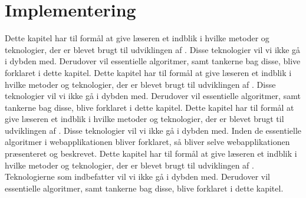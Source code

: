 \chapter{Implementering}
\label{chap:implementering}
Dette kapitel har til formål at give læseren et indblik i hvilke metoder og teknologier, der er blevet brugt til udviklingen af \Foodl. Disse teknologier vil vi ikke gå i dybden med. Derudover vil essentielle algoritmer, samt tankerne bag disse, blive forklaret i dette kapitel.
Dette kapitel har til formål at give læseren et indblik i hvilke metoder og teknologier, der er blevet brugt til udviklingen af \Foodl. Disse teknologier vil vi ikke gå i dybden med. Derudover vil essentielle algoritmer, samt tankerne bag disse, blive forklaret i dette kapitel.
Dette kapitel har til formål at give læseren et indblik i hvilke metoder og teknologier, der er blevet brugt til udviklingen af \Foodl. Disse teknologier vil vi ikke gå i dybden med. Inden de essentielle algoritmer i webapplikationen bliver forklaret, så bliver selve webapplikationen præsenteret og beskrevet.
Dette kapitel har til formål at give læseren et indblik i hvilke metoder og teknologier, der er blevet brugt til udviklingen af \Foodl. Teknologierne som indbefatter vil vi ikke gå i dybden med. Derudover vil essentielle algoritmer, samt tankerne bag disse, blive forklaret i dette kapitel.



